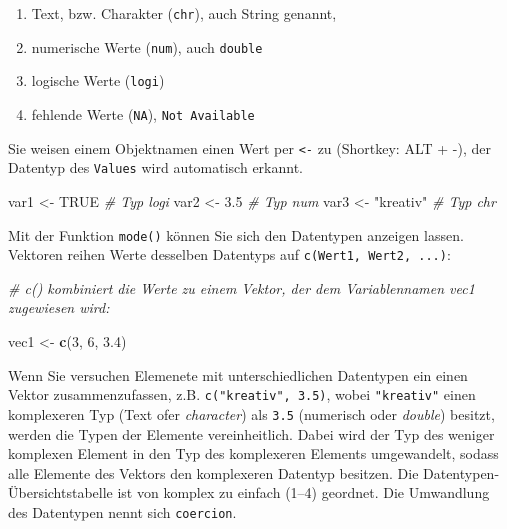 \documentclass[
  ngerman,
]{book}
\newenvironment{Shaded}{\begin{snugshade}}{\end{snugshade}}
\newcommand{\CommentTok}[1]{\textcolor[rgb]{0.56,0.35,0.01}{\textit{#1}}}
\newcommand{\ConstantTok}[1]{\textcolor[rgb]{0.56,0.35,0.01}{#1}}
\newcommand{\DecValTok}[1]{\textcolor[rgb]{0.00,0.00,0.81}{#1}}
\newcommand{\FloatTok}[1]{\textcolor[rgb]{0.00,0.00,0.81}{#1}}
\newcommand{\FunctionTok}[1]{\textcolor[rgb]{0.13,0.29,0.53}{\textbf{#1}}}
\newcommand{\NormalTok}[1]{#1}
\newcommand{\OtherTok}[1]{\textcolor[rgb]{0.56,0.35,0.01}{#1}}
\newcommand{\StringTok}[1]{\textcolor[rgb]{0.31,0.60,0.02}{#1}}
\providecommand{\tightlist}{%
  \setlength{\itemsep}{0pt}\setlength{\parskip}{0pt}}
\begin{document}
\begin{enumerate}
\def\labelenumi{\arabic{enumi}.}
\tightlist
\item
  Text, bzw. Charakter (\texttt{chr}), auch String genannt,
\item
  numerische Werte (\texttt{num}), auch \texttt{double}
\item
  logische Werte (\texttt{logi})
\item
  fehlende Werte (\texttt{NA}), \texttt{Not\ Available}
\end{enumerate}

Sie weisen einem Objektnamen einen Wert per \texttt{\textless{}-} zu (Shortkey: ALT + -), der Datentyp des \texttt{Values} wird automatisch erkannt.

\begin{Shaded}
\begin{Highlighting}[]
\NormalTok{var1 }\OtherTok{\textless{}{-}} \ConstantTok{TRUE}      \CommentTok{\# Typ logi }
\NormalTok{var2 }\OtherTok{\textless{}{-}} \FloatTok{3.5}       \CommentTok{\# Typ num}
\NormalTok{var3 }\OtherTok{\textless{}{-}} \StringTok{"kreativ"} \CommentTok{\# Typ chr  }
\end{Highlighting}
\end{Shaded}

Mit der Funktion \texttt{mode()} können Sie sich den Datentypen anzeigen lassen.
Vektoren reihen Werte desselben Datentyps auf \texttt{c(Wert1,\ Wert2,\ ...)}:

\begin{Shaded}
\begin{Highlighting}[]
\CommentTok{\# c() kombiniert die Werte zu einem Vektor, der dem Variablennamen vec1 zugewiesen wird:}

\NormalTok{vec1 }\OtherTok{\textless{}{-}} \FunctionTok{c}\NormalTok{(}\DecValTok{3}\NormalTok{, }\DecValTok{6}\NormalTok{, }\FloatTok{3.4}\NormalTok{)}
\end{Highlighting}
\end{Shaded}

Wenn Sie versuchen Elemenete mit unterschiedlichen Datentypen ein einen Vektor zusammenzufassen, z.B. \texttt{c("kreativ",\ 3.5)}, wobei \texttt{"kreativ"} einen komplexeren Typ (Text ofer \emph{character}) als \texttt{3.5} (numerisch oder \emph{double}) besitzt, werden die Typen der Elemente vereinheitlich. Dabei wird der Typ des weniger komplexen Element in den Typ des komplexeren Elements umgewandelt, sodass alle Elemente des Vektors den komplexeren Datentyp besitzen. Die Datentypen-Übersichtstabelle ist von komplex zu einfach (1--4) geordnet. Die Umwandlung des Datentypen nennt sich \texttt{coercion}.
\end{document}
